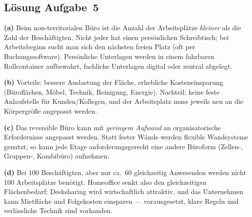 \documentclass[11pt, a4paper]{article}
\begin{document}
\subsection*{Lösung Aufgabe~5}
\begin{loesung}
\textbf{(a)} Beim non-territorialen Büro ist die Anzahl der Arbeitsplätze \emph{kleiner}
als die Zahl der Beschäftigten. Nicht jeder hat einen persönlichen Schreibtisch; bei
Arbeitsbeginn sucht man sich den nächsten freien Platz (oft per Buchungssoftware).
Persönliche Unterlagen werden in einem fahrbaren Rollcontainer aufbewahrt, fachliche
Unterlagen digital oder zentral abgelegt.

\textbf{(b)} Vorteile: bessere Auslastung der Fläche, erhebliche Kosteneinsparung
(Büroflächen, Möbel, Technik, Reinigung, Energie). Nachteil: keine feste Anlaufstelle
für Kunden/Kollegen, und der Arbeitsplatz muss jeweils neu an die Körpergröße angepasst
werden.

\textbf{(c)} Das reversible Büro kann mit \emph{geringem Aufwand} an organisatorische
Erfordernisse angepasst werden. Statt fester Wände werden flexible Wandsysteme genutzt;
so kann jede Etage anforderungsgerecht eine andere Büroform (Zellen-, Gruppen-,
Kombibüro) aufnehmen.

\textbf{(d)} Bei 100 Beschäftigten, aber nur ca.\ 60 gleichzeitig Anwesenden werden
nicht 100 Arbeitsplätze benötigt. Homeoffice senkt also den gleichzeitigen
Flächenbedarf; Desksharing wird wirtschaftlich attraktiv, und das Unternehmen kann
Mietfläche und Folgekosten einsparen --- vorausgesetzt, klare Regeln und verlässliche
Technik sind vorhanden.
\end{loesung}
\end{document}
